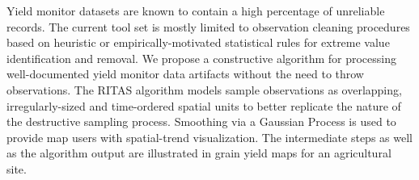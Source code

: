 
Yield monitor datasets are known to contain a high percentage of
unreliable records. The current tool set is mostly limited to
observation cleaning procedures based on heuristic or
empirically-motivated statistical rules for extreme value
identification and removal. We propose a constructive algorithm for
processing well-documented yield monitor data artifacts without the
need to throw observations. The RITAS algorithm models sample
observations as overlapping, irregularly-sized and time-ordered
spatial units to better replicate the nature of the destructive
sampling process. Smoothing via a Gaussian Process is used to provide
map users with spatial-trend visualization. The intermediate steps as
well as the algorithm output are illustrated in grain yield maps for
an agricultural site.

